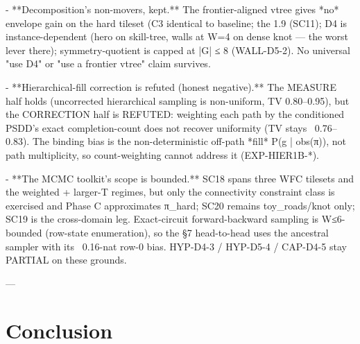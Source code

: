 \documentclass[letterpaper]{article} %
\begin{document}
- **Decomposition's non-movers, kept.** The frontier-aligned vtree gives *no* envelope gain on the
  hard tileset (C3 identical to baseline; the 1.9%
  (SC11); D4 is instance-dependent (hero on skill-tree, walls at W=4 on dense knot — the worst lever
  there); symmetry-quotient is capped at |G| ≤ 8 (WALL-D5-2). No universal "use D4" or "use a frontier
  vtree" claim survives.

- **Hierarchical-fill correction is refuted (honest negative).** The MEASURE half holds (uncorrected
  hierarchical sampling is non-uniform, TV 0.80–0.95), but the CORRECTION half is REFUTED: weighting
  each path by the conditioned PSDD's exact completion-count does not recover uniformity (TV stays
  ~0.76–0.83). The binding bias is the non-deterministic off-path *fill* P(g | obs(π)), not path
  multiplicity, so count-weighting cannot address it (EXP-HIER1B-*).

- **The MCMC toolkit's scope is bounded.** SC18 spans three WFC tilesets and the weighted + larger-T
  regimes, but only the connectivity constraint class is exercised and Phase C approximates π_hard;
  SC20 remains toy_roads/knot only; SC19 is the cross-domain leg. Exact-circuit forward-backward
  sampling is W≤6-bounded (row-state enumeration), so the §7 head-to-head uses the ancestral sampler
  with its ~0.16-nat row-0 bias. HYP-D4-3 / HYP-D5-4 / CAP-D4-5 stay PARTIAL on these grounds.

---

\section{Conclusion}

\end{document}
